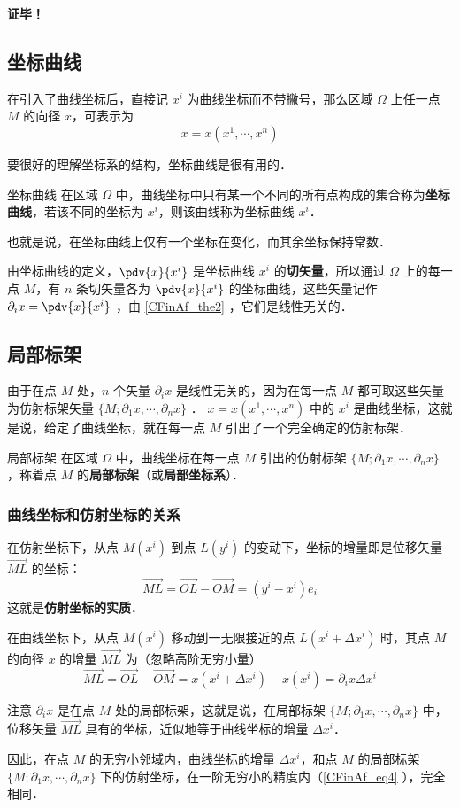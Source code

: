 \textbf{证毕！}
\subsection{坐标曲线}
在引入了曲线坐标后，直接记 $x^i$ 为曲线坐标而不带撇号，那么区域 $\Omega$ 上任一点 $M$ 的向径 $x$，可表示为
\begin{equation}
x=x(x^1,\cdots,x^n)
\end{equation}

要很好的理解坐标系的结构，坐标曲线是很有用的．
\begin{definition}{坐标曲线}
在区域 $\Omega$ 中，曲线坐标中只有某一个不同的所有点构成的集合称为\textbf{坐标曲线}，若该不同的坐标为 $x^i$，则该曲线称为坐标曲线 $x^i$．
\end{definition}
也就是说，在坐标曲线上仅有一个坐标在变化，而其余坐标保持常数．

由坐标曲线的定义，$\pdv{x}{x^i}$ 是坐标曲线 $x^i$ 的\textbf{切矢量}，所以通过 $\Omega$ 上的每一点 $M$，有 $n$ 条切矢量各为 $\pdv{x}{x^i}$ 的坐标曲线，这些矢量记作 $\partial_i x=\pdv{x}{x^i}$ ，由 \autoref{CFinAf_the2} ，它们是线性无关的．
\subsection{局部标架}
由于在点 $M$ 处，$n$ 个矢量 $\partial_i x$ 是线性无关的，因为在每一点 $M$ 都可取这些矢量为仿射标架矢量 $\{M;\partial_1 x,\cdots,\partial_n x\}$ ． $x=x(x^1,\cdots,x^n)$ 中的 $x^i$ 是曲线坐标，这就是说，给定了曲线坐标，就在每一点 $M$ 引出了一个完全确定的仿射标架．
\begin{definition}{局部标架}
在区域 $\Omega$ 中，曲线坐标在每一点 $M$ 引出的仿射标架 $\{M;\partial_1 x,\cdots,\partial_n x\}$ ，称着点 $M$ 的\textbf{局部标架}（或\textbf{局部坐标系}）．
\end{definition} 
\subsubsection{曲线坐标和仿射坐标的关系}
在仿射坐标下，从点 $M(x^i)$ 到点 $L(y^i)$ 的变动下，坐标的增量即是位移矢量 $\overrightarrow{ML}$ 的坐标：
\begin{equation}
\overrightarrow{ML}=\overrightarrow{OL}-\overrightarrow{OM}=(y^i-x^i)e_i
\end{equation}
这就是\textbf{仿射坐标的实质}．

在曲线坐标下，从点 $M(x^i)$ 移动到一无限接近的点 $L(x^i+\Delta x^i)$ 时，其点 $M$ 的向径 $x$ 的增量 $\overrightarrow{ML}$ 为（忽略高阶无穷小量）
\begin{equation}\label{CFinAf_eq4}
\overrightarrow{ML}=\overrightarrow{OL}-\overrightarrow{OM}=x(x^i+\Delta x^i)-x(x^i)=\partial_i x\Delta x^i
\end{equation}

注意 $\partial_i x$ 是在点 $M$ 处的局部标架，这就是说，在局部标架 $\{M;\partial_1 x,\cdots,\partial_n x\}$ 中，位移矢量 $\overrightarrow{ML}$ 具有的坐标，近似地等于曲线坐标的增量 $\Delta x^i$．

因此，在点 $M$ 的无穷小邻域内，曲线坐标的增量 $\Delta x^i$，和点 $M$ 的局部标架 $\{M;\partial_1 x,\cdots,\partial_n x\}$ 下的仿射坐标，在一阶无穷小的精度内（\autoref{CFinAf_eq4} ），完全相同．


